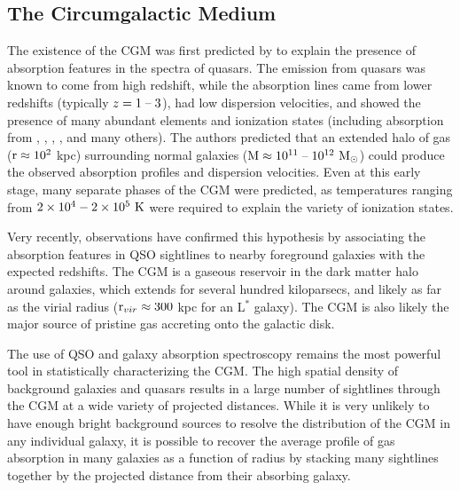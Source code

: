 \subsection{The Circumgalactic Medium}
\label{sec:Galaxy.CGM}

The existence of the CGM was first predicted by \citet{Bahcall1969} to
explain the presence of absorption features in the spectra of
quasars. The emission from quasars was known to come from high
redshift, while the absorption lines came from lower redshifts
(typically $z = 1\;\textrm{--}\;3$), had low dispersion velocities, and showed
the presence of many abundant elements and ionization states
(including absorption from , , ,
, and many others). The authors predicted that an extended
halo of gas ($\textrm{r}{} \approx 10^2$ kpc) surrounding normal galaxies
($\textrm{M}{} \approx 10^{11}\;\textrm{--}\;10^{12}~\textrm{M}_\odot$) could produce the observed
absorption profiles and dispersion velocities. Even at this early
stage, many separate phases of the CGM were predicted, as temperatures
ranging from $2\times 10^{4} - 2\times 10^{5}~\textrm{K}$ were required to
explain the variety of ionization states.

Very recently, observations have confirmed this hypothesis by
associating the absorption features in QSO sightlines to nearby
foreground galaxies with the expected redshifts. The CGM is a gaseous
reservoir in the dark matter halo around galaxies, which extends for
several hundred kiloparsecs, and likely as far as the virial radius
($\textrm{r\ensuremath{_{vir}}}{}\approx 300$ kpc for an L$^*$ galaxy). The CGM is also likely
the major source of pristine gas accreting onto the galactic disk.

The use of QSO and galaxy absorption spectroscopy remains the most
powerful tool in statistically characterizing the CGM. The high
spatial density of background galaxies and quasars results in a large
number of sightlines through the CGM at a wide variety of projected
distances. While it is very unlikely to have enough bright background
sources to resolve the distribution of the CGM in any individual
galaxy, it is possible to recover the average profile of gas
absorption in many galaxies as a function of radius by stacking many
sightlines together by the projected distance from their absorbing
galaxy.

